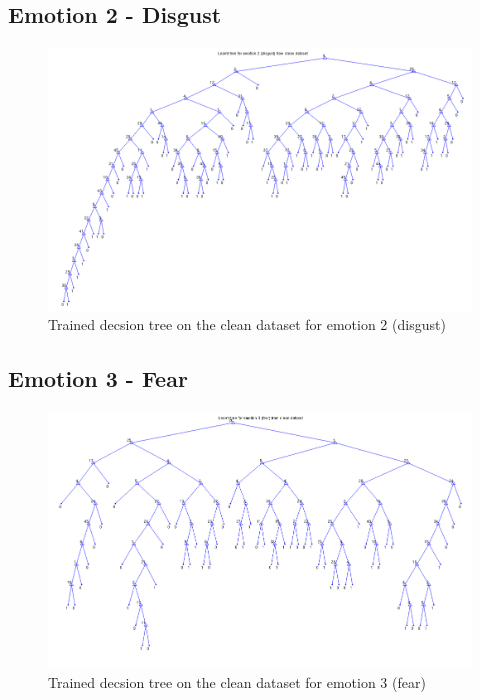 \documentclass[a4paper]{article}
\begin{document}
\subsection{Emotion 2 - Disgust}
\begin{figure}[H]
\center
\includegraphics[width=0.9\columnwidth]{DisgustTree} %
\caption{Trained decsion tree on the clean dataset for emotion 2 (disgust)}
\end{figure}

\subsection{Emotion 3 - Fear}
\begin{figure}[H]
\center
\includegraphics[width=0.9\columnwidth]{FearTree} %
\caption{Trained decsion tree on the clean dataset for emotion 3 (fear)}
\end{figure}

\bigskip\bigskip\bigskip\bigskip\bigskip\bigskip
\end{document}
